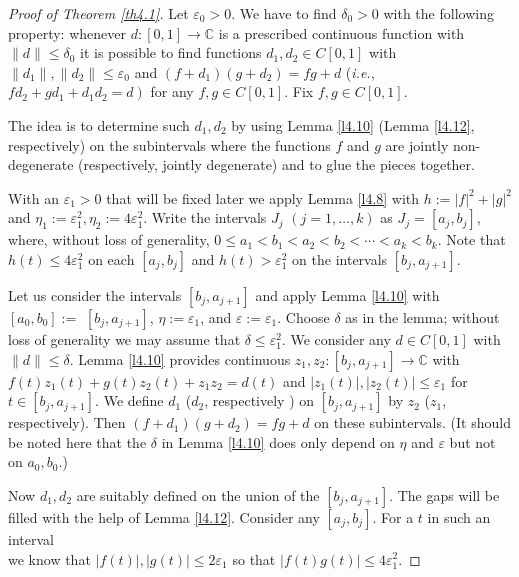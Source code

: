\documentclass[12pt,fleqn]{amsart}
\theoremstyle{definition}
\numberwithin{equation}{section}
\theoremstyle{remark}
\begin{document}
\begin{proof}[Proof of Theorem \ref{th4.1}]
    Let $\varepsilon_{0}>0$. We have to find $\delta_{0}>0$ with the following property: whenever $d\colon[0,1] \rightarrow \mathbb{C}$ is a prescribed continuous function with $\|d\| \leqslant \delta_{0}$ it is possible to find functions $d_{1}, d_{2} \in C[0,1]$ with $\left\|d_{1}\right\|,\left\|d_{2}\right\| \leqslant \varepsilon_{0}$ and $\left(f+d_{1}\right)\left(g+d_{2}\right)=f g+d$ (\emph{i.e.}, $\left.f d_{2}+g d_{1}+d_{1} d_{2}=d\right)$ for any $f, g \in C[0,1]$. Fix $f, g \in C[0,1].$\smallskip

    The idea is to determine such $d_{1}, d_{2}$ by using Lemma \ref{l4.10} (Lemma \ref{l4.12}, respectively) on the subintervals where the functions $f$ and $g$ are jointly non-degenerate (respectively, jointly degenerate) and to glue the pieces together.\smallskip

    With an $\varepsilon_{1}>0$ that will be fixed later we apply Lemma \ref{l4.8} with $h:=|f|^{2}+|g|^{2}$ and $\eta_{1}:=\varepsilon_{1}^{2}, \eta_{2}:=4 \varepsilon_{1}^{2}$. Write the intervals $J_{j}$ $(j=1, \ldots, k)$ as $J_{j}=\left[a_{j}, b_{j}\right]$, where, without loss of generality, $0 \leqslant a_{1}<b_{1}<a_{2}<b_{2}<\cdots<a_{k}<b_{k}$. Note that $h(t) \leqslant 4 \varepsilon_{1}^{2}$ on each $\left[a_{j}, b_{j}\right]$ and $h(t)>\varepsilon_{1}^{2}$ on the intervals $\left[b_{j}, a_{j+1}\right]$.\smallskip

    Let us consider the intervals $\left[b_{j}, a_{j+1}\right]$ and apply Lemma \ref{l4.10} with $\left[a_{0}, b_{0}\right]:=$ $\left[b_{j}, a_{j+1}\right]$, $\eta:=\varepsilon_{1}$, and $\varepsilon:=\varepsilon_{1}$. Choose $\delta$ as in the lemma; without loss of generality we may assume that $\delta \leqslant \varepsilon_{1}^{2}$. We consider any $d \in C[0,1]$ with $\|d\| \leqslant \delta$. Lemma \ref{l4.10} provides continuous $z_{1}, z_{2}\colon \left[b_{j}, a_{j+1}\right] \rightarrow \mathbb{C}$ with $f(t) z_{1}(t)+g(t) z_{2}(t) + z_1z_2 = d(t)$ and $\left|z_{1}(t)\right|,\left|z_{2}(t)\right| \leqslant \varepsilon_{1}$ for $t \in\left[b_{j}, a_{j+1}\right]$. We define $d_{1}$ ($d_{2}$, respectively ) on $\left[b_{j}, a_{j+1}\right]$ by $z_{2}$ ($z_{1}$, respectively). Then $\left(f+d_{1}\right)\left(g+d_{2}\right)=f g+d$ on these subintervals. (It should be noted here that the $\delta$ in Lemma \ref{l4.10} does only depend on $\eta$ and $\varepsilon$ but not on $a_{0}, b_{0}$.)\smallskip

    Now $d_{1}, d_{2}$ are suitably defined on the union of the $\left[b_{j}, a_{j+1}\right]$. The gaps will be filled with the help of Lemma \ref{l4.12}. Consider any $\left[a_{j}, b_{j}\right]$. For a $t$ in such an interval\\
    we know that $|f(t)|,|g(t)| \leqslant 2 \varepsilon_{1}$ so that $|f(t) g(t)| \leqslant 4 \varepsilon_{1}^{2}$.


\end{proof}
\end{document}
